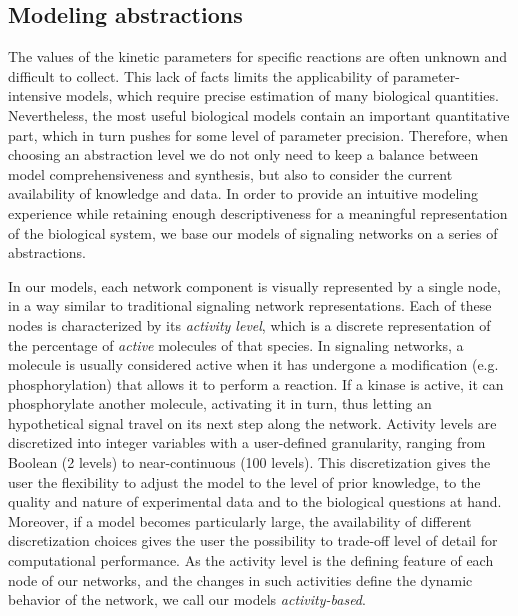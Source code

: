 
\subsection{Modeling abstractions}\label{subsec:abstractions}
The values of the kinetic parameters for specific reactions are often unknown and
difficult to collect.
This lack of facts limits the applicability of parameter-intensive models,
which require precise estimation of many biological quantities.
Nevertheless, the most useful biological models contain an important quantitative part, which in turn pushes for some
level of parameter precision.
Therefore, when choosing an abstraction level we do not only need to keep a balance between model comprehensiveness and synthesis,
but also to consider the current availability of knowledge and data. In order to provide an intuitive modeling
experience while retaining enough descriptiveness for a meaningful representation of the biological system, we base
our models of signaling networks on a series of abstractions.

In our models, each network component is visually represented by a single node, in a way similar to traditional
signaling network representations.
Each of these nodes is characterized by its \emph{activity level}, which
is a discrete representation of the percentage of \emph{active} molecules of that species. In signaling networks,
a molecule is usually considered active when it has undergone a modification (e.g. phosphorylation) that
allows it to perform a reaction. If a kinase is active, it can phosphorylate another molecule, activating it
in turn, thus letting an hypothetical signal travel on its next step along the network. Activity levels are discretized
into integer variables with a user-defined granularity, ranging from Boolean (2 levels) to near-continuous (100 levels).
This discretization gives the user the flexibility to adjust the model to the level of prior knowledge,
to the quality and nature of experimental data and to the biological questions at hand. Moreover, if a model
becomes particularly large, the availability of different discretization choices gives the user
the possibility to trade-off level of detail for computational performance. As the activity level is the
defining feature of each node of our networks, and the changes in such activities define the
dynamic behavior of the network, we call our models \emph{activity-based}.


